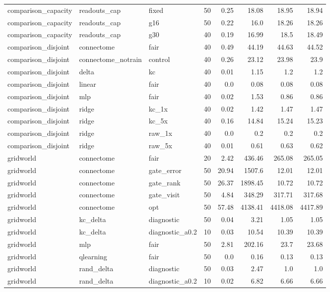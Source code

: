 \begin{table}[t]
\begin{tabular}{lllrrrrr}
comparison\_capacity & readouts\_cap & fixed & 50 & 0.25 & 18.08 & 18.95 & 18.94 \\
comparison\_capacity & readouts\_cap & g16 & 50 & 0.22 & 16.0 & 18.26 & 18.26 \\
comparison\_capacity & readouts\_cap & g30 & 40 & 0.19 & 16.99 & 18.5 & 18.49 \\
comparison\_disjoint & connectome & fair & 40 & 0.49 & 44.19 & 44.63 & 44.52 \\
comparison\_disjoint & connectome\_notrain & control & 40 & 0.26 & 23.12 & 23.98 & 23.9 \\
comparison\_disjoint & delta & kc & 40 & 0.01 & 1.15 & 1.2 & 1.2 \\
comparison\_disjoint & linear & fair & 40 & 0.0 & 0.08 & 0.08 & 0.08 \\
comparison\_disjoint & mlp & fair & 40 & 0.02 & 1.53 & 0.86 & 0.86 \\
comparison\_disjoint & ridge & kc\_1x & 40 & 0.02 & 1.42 & 1.47 & 1.47 \\
comparison\_disjoint & ridge & kc\_5x & 40 & 0.16 & 14.84 & 15.24 & 15.23 \\
comparison\_disjoint & ridge & raw\_1x & 40 & 0.0 & 0.2 & 0.2 & 0.2 \\
comparison\_disjoint & ridge & raw\_5x & 40 & 0.01 & 0.61 & 0.63 & 0.62 \\
gridworld & connectome & fair & 20 & 2.42 & 436.46 & 265.08 & 265.05 \\
gridworld & connectome & gate\_error & 50 & 20.94 & 1507.6 & 12.01 & 12.01 \\
gridworld & connectome & gate\_rank & 50 & 26.37 & 1898.45 & 10.72 & 10.72 \\
gridworld & connectome & gate\_visit & 50 & 4.84 & 348.29 & 317.71 & 317.68 \\
gridworld & connectome & opt & 50 & 57.48 & 4138.41 & 4418.08 & 4417.89 \\
gridworld & kc\_delta & diagnostic & 50 & 0.04 & 3.21 & 1.05 & 1.05 \\
gridworld & kc\_delta & diagnostic\_a0.2 & 10 & 0.03 & 10.54 & 10.39 & 10.39 \\
gridworld & mlp & fair & 50 & 2.81 & 202.16 & 23.7 & 23.68 \\
gridworld & qlearning & fair & 50 & 0.0 & 0.16 & 0.13 & 0.13 \\
gridworld & rand\_delta & diagnostic & 50 & 0.03 & 2.47 & 1.0 & 1.0 \\
gridworld & rand\_delta & diagnostic\_a0.2 & 10 & 0.02 & 6.82 & 6.66 & 6.66 \\

\end{tabular}
\end{table}
